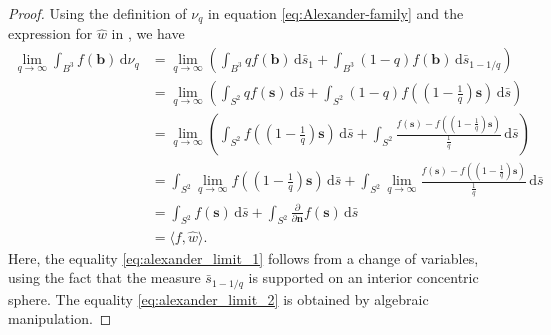 \documentclass[10pt,a4paper]{amsart}
\newcommand{\dd}{\mathrm{d}} %
\newcommand{\dispair}[2]{\langle #2,#1 \rangle}
\renewcommand{\vec}{\mathbf}
\begin{document}
\begin{proof}
Using the definition of \(\nu_q\) in equation \eqref{eq:Alexander-family} and the expression for \(\widehat{w}\) in , we have
    \begin{align}
        \lim_{q\to \infty}
            \int_{B^3} f(\vec{b}) \,\dd \nu_q 
        \nonumber 
        &=
        \lim_{q\to \infty}
        \left(
            \int_{B^3} q f(\vec{b})  \,\dd \bar{s}_1 
            + 
            \int_{B^3} (1 - q)f(\vec{b}) \,\dd\bar{s}_{1-1/q}
        \right)
        \nonumber \\
        &=
        \lim_{q\to \infty}
        \left(
            \int_{S^2} q f(\vec{s})\,\dd \bar{s} 
            + 
            \int_{S^2} (1 - q) f\left(\left(1-\tfrac{1}{q}\right)\vec{s}\right)\,\dd\bar{s}
        \right)
        \label{eq:alexander_limit_1} \\
        &=
        \lim_{q\to \infty}
        \left(
            \int_{S^2} f\left(\left(1-\tfrac{1}{q}\right)\vec{s}\right) \,\dd \bar{s} 
            + 
            \int_{S^2} \frac{f(\vec{s}) - f\left(\left(1-\tfrac{1}{q}\right)\vec{s}\right)}{\tfrac{1}{q}} \,\dd\bar{s}
        \right)
        \label{eq:alexander_limit_2} \\
        &=
        \int_{S^2} \lim_{q\to \infty} f\left(\left(1-\tfrac{1}{q}\right)\vec{s}\right) \,\dd \bar{s} 
        + 
        \int_{S^2} \lim_{q\to \infty} \frac{f(\vec{s}) - f\left(\left(1-\tfrac{1}{q}\right)\vec{s}\right)}{\tfrac{1}{q}} \,\dd\bar{s}
        \label{eq:alexander_limit_3} \\
        &=
        \int_{S^2} f(\vec{s}) \,\dd \bar{s}
        +
        \int_{S^2} \tfrac{\partial}{\partial \vec{n}} f(\vec{s}) \,\dd \bar{s}
        \label{eq:alexander_limit_4} \\
        &=
        \dispair{\widehat{w}}{f}.
        \nonumber 
    \end{align}
Here, the equality \eqref{eq:alexander_limit_1} follows from a change of variables, using the fact that the measure \(\bar s_{1-1/q}\) is supported on an interior concentric sphere. The equality \eqref{eq:alexander_limit_2} is obtained by algebraic manipulation.


\end{proof}
\end{document}
